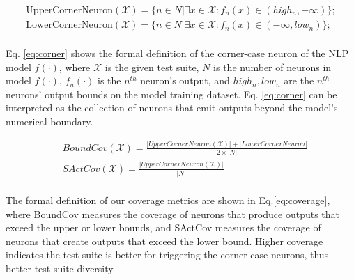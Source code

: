 \begin{equation}
\begin{split}
    \text{UpperCornerNeuron}(\mathcal{X}) = \{n \in N | \exists x \in \mathcal{X}: f_n(x) \in (high_n, +\infty)\}; \\
    \text{LowerCornerNeuron}(\mathcal{X}) = \{n \in N | \exists x \in \mathcal{X}: f_n(x) \in (-\infty, low_n)\}; \\
\end{split}
    \label{eq:corner}
\end{equation}

\noindent Eq. \ref{eq:corner} shows the formal definition of the corner-case neuron of the NLP model $f(\cdot)$, where $\mathcal{X}$ is the given test suite, $N$ is the number of neurons in model $f(\cdot)$, $f_n(\cdot)$ is the $n^{th}$ neuron's output, and $high_n, low_n$ are the $n^{th}$ neurons' output bounds on the model training dataset.
Eq. \ref{eq:corner} can be interpreted as the collection of neurons that emit outputs beyond the model's numerical boundary.

\begin{equation}
\begin{split}
     & BoundCov(\mathcal{X}) = \frac{|UpperCornerNeuron(\mathcal{X})| + |LowerCornerNeuron| }{2 \times |N|} \\ 
     & SActCov(\mathcal{X}) = \frac{|UpperCornerNeuron(\mathcal{X})|} {|N|} \\ 
\end{split}
    \label{eq:coverage}
\end{equation}

\noindent The formal definition of our coverage metrics are shown in Eq.\ref{eq:coverage}, where BoundCov measures the coverage of neurons that produce outputs that exceed the upper or lower bounds, and SActCov measures the coverage of neurons that create outputs that exceed the lower bound.
Higher coverage indicates the test suite is better for triggering the corner-case neurons, thus better test suite diversity.





